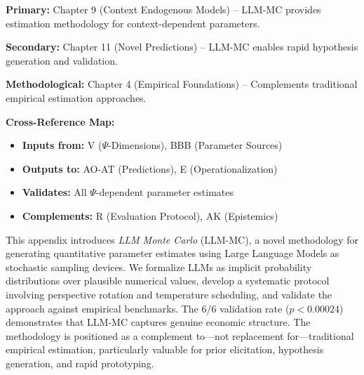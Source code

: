 
\begin{tcolorbox}[colback=gray!10!white, colframe=gray!75!black,
    title=\textbf{Chapter Linkage}]

\textbf{Primary:} Chapter 9 (Context Endogenous Models) -- LLM-MC provides
estimation methodology for context-dependent parameters.

\textbf{Secondary:} Chapter 11 (Novel Predictions) -- LLM-MC enables rapid
hypothesis generation and validation.

\textbf{Methodological:} Chapter 4 (Empirical Foundations) -- Complements
traditional empirical estimation approaches.

\end{tcolorbox}


\noindent\textbf{Cross-Reference Map:}
\begin{itemize}[nosep]
    \item \textbf{Inputs from:} V ($\Psi$-Dimensions), BBB (Parameter Sources)
    \item \textbf{Outputs to:} AO-AT (Predictions), E (Operationalization)
    \item \textbf{Validates:} All $\Psi$-dependent parameter estimates
    \item \textbf{Complements:} R (Evaluation Protocol), AK (Epistemics)
\end{itemize}


\begin{tcolorbox}[colback=green!5!white, colframe=green!75!black,
    title=\textbf{Abstract}]

This appendix introduces \textit{LLM Monte Carlo} (LLM-MC), a novel methodology
for generating quantitative parameter estimates using Large Language Models as
stochastic sampling devices. We formalize LLMs as implicit probability
distributions over plausible numerical values, develop a systematic protocol
involving perspective rotation and temperature scheduling, and validate the
approach against empirical benchmarks. The 6/6 validation rate ($p < 0.00024$)
demonstrates that LLM-MC captures genuine economic structure. The methodology
is positioned as a complement to---not replacement for---traditional empirical
estimation, particularly valuable for prior elicitation, hypothesis generation,
and rapid prototyping.

\end{tcolorbox}


